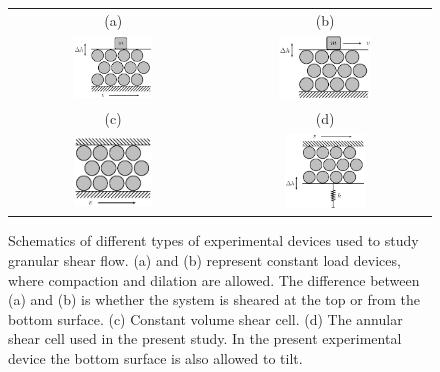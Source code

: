 \begin{figure}[h]
  \centering
  \begin{tabular}{c c}
    \hspace{1.2cm}(a) & \hspace{1.2cm}(b) \\
    \includegraphics[width=0.4\textwidth]{./figs/comparison2.eps} &
    \includegraphics[width=0.46\textwidth]{./figs/comparisonD.eps}\\
    \hspace{1.2cm}(c) & \hspace{1.2cm}(d) \\
    \includegraphics[width=0.4\textwidth]{./figs/comparisonC.eps} &
    \includegraphics[width=0.4\textwidth]{./figs/comparison3.eps}\\
  \end{tabular}
\caption[Schematics of different types of experimental devices
used to study granular shear flow.]{Schematics of different types of experimental devices
used to study granular shear flow. (a) and (b) represent constant
load devices, where compaction and dilation are allowed. The
difference between (a) and (b) is whether the system is sheared at
the top or from the bottom surface. (c) Constant volume shear
cell. (d) The annular shear cell used in the present study. In the
present experimental device the bottom surface is also allowed to
tilt.} \label{fig:figcomp}
\end{figure}

\clearpage
